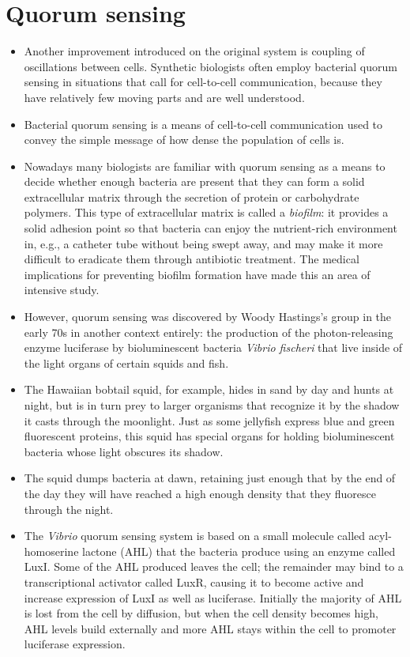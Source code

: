 \documentclass{article}
\begin{document}
\section*{Quorum sensing}
\begin{itemize}
\item Another improvement introduced on the original system is coupling of oscillations between cells. Synthetic biologists often employ bacterial quorum sensing in situations that call for cell-to-cell communication, because they have relatively few moving parts and are well understood.
\item Bacterial quorum sensing is a means of cell-to-cell communication used to convey the simple message of how dense the population of cells is.
\item  Nowadays many biologists are familiar with quorum sensing as a means to decide whether enough bacteria are present that they can form a solid extracellular matrix through the secretion of protein or carbohydrate polymers. This type of extracellular matrix is called a \textit{biofilm}: it provides a solid adhesion point so that bacteria can enjoy the nutrient-rich environment in, e.g., a catheter tube without being swept away, and may make it more difficult to eradicate them through antibiotic treatment. The medical implications for preventing biofilm formation have made this an area of intensive study.
\item However, quorum sensing was discovered by Woody Hastings's group in the early 70s in another context entirely: the production of the photon-releasing enzyme luciferase by bioluminescent bacteria \textit{Vibrio fischeri} that live inside of the light organs of certain squids and fish.
\item The Hawaiian bobtail squid, for example, hides in sand by day and hunts at night, but is in turn prey to larger organisms that recognize it by the shadow it casts through the moonlight. Just as some jellyfish express blue and green fluorescent proteins, this squid has special organs for holding bioluminescent bacteria whose light obscures its shadow.
\item The squid dumps bacteria at dawn, retaining just enough that by the end of the day they will have reached a high enough density that they fluoresce through the night.
\item The \textit{Vibrio} quorum sensing system is based on a small molecule called acyl-homoserine lactone (AHL) that the bacteria produce using an enzyme called LuxI. Some of the AHL produced leaves the cell; the remainder may bind to a transcriptional activator called LuxR, causing it to become active and increase expression of LuxI as well as luciferase. Initially the majority of AHL is lost from the cell by diffusion, but when the cell density becomes high, AHL levels build externally and more AHL stays within the cell to promoter luciferase expression.
\end{itemize}
\end{document}
